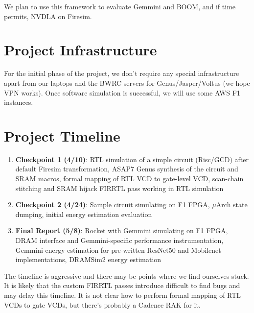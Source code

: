 \documentclass[sigconf]{acmart}
\begin{document}
We plan to use this framework to evaluate Gemmini\cite{gemmini} and BOOM, and if time permits, NVDLA on Firesim\cite{nvdlafiresim}.

\section{Project Infrastructure}
For the initial phase of the project, we don't require any special infrastructure apart from our laptops and the BWRC servers for Genus/Jasper/Voltus (we hope VPN works).
Once software simulation is successful, we will use some AWS F1 instances.

\section{Project Timeline}

\begin{enumerate}
  \item \textbf{Checkpoint 1 (4/10)}: RTL simulation of a simple circuit (Risc/GCD) after default Firesim transformation, ASAP7 Genus synthesis of the circuit and SRAM macros, formal mapping of RTL VCD to gate-level VCD, scan-chain stitching and SRAM hijack FIRRTL pass working in RTL simulation
  \item \textbf{Checkpoint 2 (4/24)}: Sample circuit simulating on F1 FPGA, $\mu$Arch state dumping, initial energy estimation evaluation
  \item \textbf{Final Report (5/8)}: Rocket with Gemmini simulating on F1 FPGA, DRAM interface and Gemmini-specific performance instrumentation, Gemmini energy estimation for pre-written ResNet50 and Mobilenet implementations, DRAMSim2 energy estimation
\end{enumerate}

The timeline is aggressive and there may be points where we find ourselves stuck.
It is likely that the custom FIRRTL passes introduce difficult to find bugs and may delay this timeline.
It is not clear how to perform formal mapping of RTL VCDs to gate VCDs, but there's probably a Cadence RAK for it.






\end{document}
